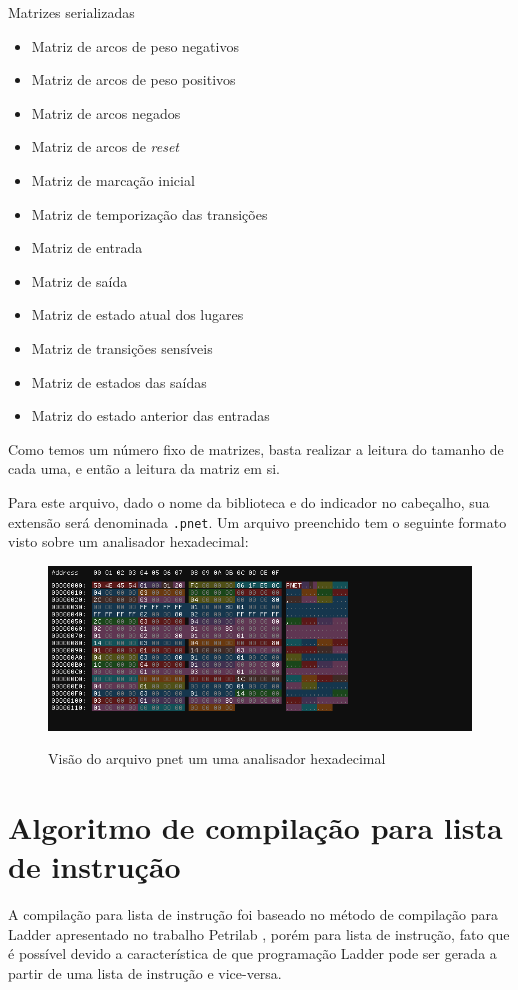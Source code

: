 Matrizes serializadas
\begin{itemize} 
	\item Matriz de arcos de peso negativos
	\item Matriz de arcos de peso positivos
	\item Matriz de arcos negados
	\item Matriz de arcos de \textit{reset}
	\item Matriz de marcação inicial
	\item Matriz de temporização das transições
	\item Matriz de entrada
	\item Matriz de saída
	\item Matriz de estado atual dos lugares
	\item Matriz de transições sensíveis
	\item Matriz de estados das saídas
	\item Matriz do estado anterior das entradas
\end{itemize}

Como temos um número fixo de matrizes, basta realizar a leitura do tamanho de cada uma, e então a leitura da matriz em si. 

Para este arquivo, dado o nome da biblioteca e do indicador no cabeçalho, sua extensão será denominada \lstinline{.pnet}. Um arquivo preenchido tem o seguinte formato visto sobre um analisador hexadecimal:

\begin{figure}[h!]
	\centering
	\caption{Visão do arquivo pnet um uma analisador hexadecimal}
	\includegraphics[width=16cm]{images/hexfile.png}
	\label{fig:hexfile}
\end{figure}

\section{Algoritmo de compilação para lista de instrução}

A compilação para lista de instrução foi baseado no método de compilação para Ladder apresentado no trabalho Petrilab \cite{de2015petrilab}, porém para lista de instrução, fato que é possível devido a característica de que programação Ladder pode ser gerada a partir de uma lista de instrução e vice-versa.   

